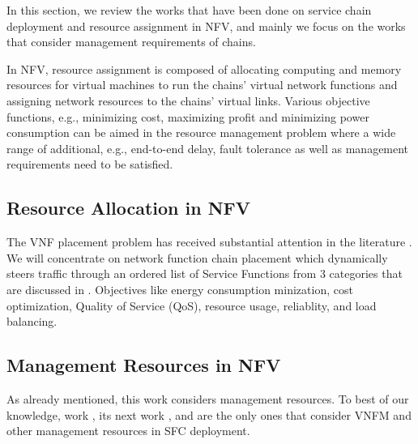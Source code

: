 In this section, we review the works that have been done on service chain deployment and resource assignment in NFV, and mainly we focus on the works that consider management requirements of chains.

In NFV, resource assignment is composed of
allocating computing and memory resources for virtual machines to run the chains' virtual network functions and assigning network resources to the chains' virtual links. Various objective functions, e.g., minimizing cost, maximizing profit and minimizing power consumption can be aimed in the resource management problem where a wide range of additional, e.g., end-to-end delay, fault tolerance as well as management requirements need to be satisfied.

\subsection{Resource Allocation in NFV}
The VNF placement problem has received substantial attention in the literature \cite{GilHerrera2016}.
We will concentrate on network function chain placement which dynamically steers
traffic through an ordered list of Service Functions from 3 categories that are discussed in \cite{Laghrissi2019}.
Objectives like energy consumption minization, cost optimization, Quality of Service (QoS), resource usage, reliablity,
and load balancing.

\subsection{Management Resources in NFV}
As already mentioned, this work considers management resources. To best of our knowledge, work \cite{AbuLebdeh2017}, its next work \cite{AbuLebdeh20172}, and \cite{Chiang2019} are the only ones that consider VNFM and other management resources in SFC deployment.

